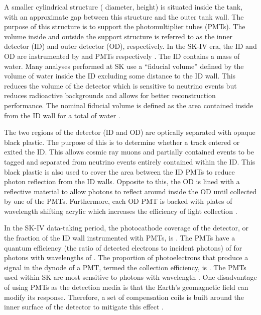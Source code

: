 A smaller cylindrical structure ( diameter,  height) is situated inside the tank, with an approximate  gap between this structure and the outer tank wall. The purpose of this structure is to support the photomultiplier tubes (PMTs). The volume inside and outside the support structure is referred to as the inner detector (ID) and outer detector (OD), respectively. In the SK-IV era, the ID and OD are instrumented by   and   PMTs respectively \cite{Abe_2014_SKCalib}. The ID contains a  mass of water. Many analyses performed at SK use a ``fiducial volume'' defined by the volume of water inside the ID excluding some distance to the ID wall. This reduces the volume of the detector which is sensitive to neutrino events but reduces radioactive backgrounds and allows for better reconstruction performance. The nominal fiducial volume is defined as the area contained inside  from the ID wall for a total of  water \cite{Jiang2019-iw}.

The two regions of the detector (ID and OD) are optically separated with opaque black plastic. The purpose of this is to determine whether a track entered or exited the ID. This allows cosmic ray muons and partially contained events to be tagged and separated from neutrino events entirely contained within the ID. This black plastic is also used to cover the area between the ID PMTs to reduce photon reflection from the ID walls. Opposite to this, the OD is lined with a reflective material to allow photons to reflect around inside the OD until collected by one of the PMTs. Furthermore, each OD PMT is backed with  plates of wavelength shifting acrylic which increases the efficiency of light collection \cite{Fukuda2003-ly}.

In the SK-IV data-taking period, the photocathode coverage of the detector, or the fraction of the ID wall instrumented with PMTs, is  \cite{Fukuda2003-ly}. The PMTs have a quantum efficiency (the ratio of detected electrons to incident photons) of  for photons with wavelengths of . The proportion of photoelectrons that produce a signal in the dynode of a PMT, termed the collection efficiency, is  \cite{Fukuda2003-ly}. The PMTs used within SK are most sensitive to photons with wavelength  \cite{Fukuda2003-ly}. One disadvantage of using PMTs as the detection media is that the Earth's geomagnetic field can modify its response. Therefore, a set of compensation coils is built around the inner surface of the detector to mitigate this effect \cite{t2k_sk}.

